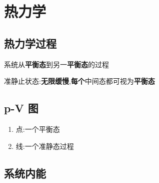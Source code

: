 \chapter{热力学}

\section{热力学过程}

系统从\textbf{平衡态}到另一\textbf{平衡态}的过程

准静止状态:\textbf{无限缓慢},\textbf{每个}中间态都可视为\textbf{平衡态}

\section{p-V 图}

\begin{enumerate}
    \item 点:一个平衡态
    \item 线:一个准静态过程
\end{enumerate}

\section{系统内能}

